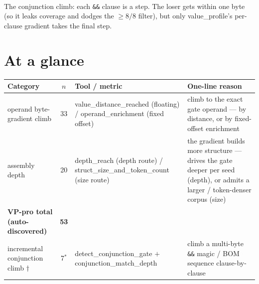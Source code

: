 \documentclass[11pt]{article}
\begin{document}
\begin{center}
\\[2pt]
{\footnotesize The conjunction climb: each \texttt{\&\&} clause is a step. The loser
gets within one byte (so it leaks coverage and dodges the $\ge 8/8$ filter), but
only value\_profile's per-clause gradient takes the final step.}
\end{center}

\section*{At a glance}
\begin{center}\small
\begin{tabular}{@{}p{3.8cm}clp{4.8cm}@{}}
\toprule
\textbf{Category} & \textbf{$n$} & \textbf{Tool / metric} & \textbf{One-line reason} \\
\midrule
operand byte-gradient climb & 33 & value\_distance\_reached (floating) / operand\_enrichment (fixed offset) & climb to the exact gate operand --- by distance, or by fixed-offset enrichment \\
assembly depth & 20 & depth\_reach (depth route) / struct\_size\_and\_token\_count (size route) & the gradient builds more structure --- drives the gate deeper per seed (depth), or admits a larger / token-denser corpus (size) \\
\midrule
\textbf{VP-pro total (auto-discovered)} & \textbf{53} & & \\
\midrule
incremental conjunction climb $\dagger$ & 7$^{*}$ & detect\_conjunction\_gate $+$ conjunction\_match\_depth & climb a multi-byte \texttt{\&\&} magic / BOM sequence clause-by-clause \\
\bottomrule
\end{tabular}
\end{center}
\end{document}
